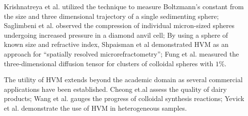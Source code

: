 Krishnatreya et al. utilized the technique to measure Boltzmann's constant from the
size and three dimensional trajectory of a single sedimenting sphere;
Saglimbeni et al. observed the compression of individual micron-sized spheres
undergoing increased pressure in a diamond anvil cell; By using a sphere
of known size and refractive index, Shpaisman et al demonstrated HVM as an
approach for ``spatially resolved microrefractometry''; Fung et al. measured
the three-dimensional diffusion tensor for clusters of colloidal spheres
with $\num{1}$\%.

The utility of HVM extends beyond the academic domain as several commercial
applications have been established. Cheong et.al assess the quality of dairy
products; Wang et al. gauges the progress of colloidal synthesis reactions;
Yevick et al. demonstrate the use of HVM in heterogeneous samples.





